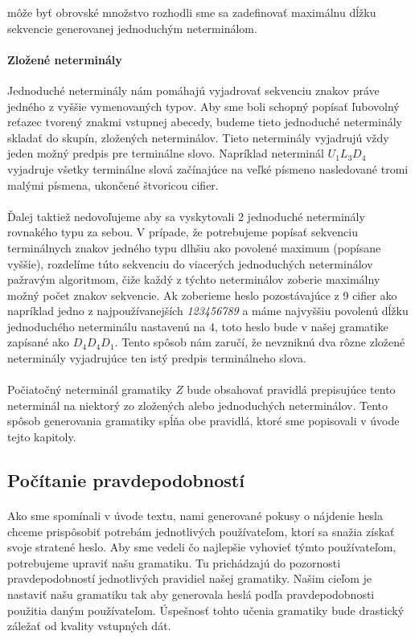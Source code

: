 môže byť obrovské množstvo rozhodli sme sa zadefinovať maximálnu dĺžku sekvencie generovanej jednoduchým neterminálom.

\paragraph{Zložené neterminály}
Jednoduché neterminály nám pomáhajú vyjadrovať sekvenciu znakov práve jedného z vyššie vymenovaných typov. Aby sme boli schopný popísať ľubovolný reťazec tvorený znakmi vstupnej abecedy, budeme tieto jednoduché neterminály skladať do skupín, zložených neterminálov. Tieto neterminály vyjadrujú vždy jeden možný predpis pre terminálne slovo. Napríklad neterminál \(U_1L_3D_4\) vyjadruje všetky terminálne slová začínajúce na veľké písmeno nasledované tromi malými písmena, ukončené štvoricou cifier.
\paragraph{}
Ďalej taktiež nedovoľujeme aby sa vyskytovali 2 jednoduché neterminály rovnakého typu za sebou. V prípade, že potrebujeme popísať sekvenciu terminálnych znakov jedného typu dlhšiu ako povolené maximum (popísane vyššie), rozdelíme túto sekvenciu do viacerých jednoduchých neterminálov pažravým algoritmom, čiže každý z týchto neterminálov zoberie maximálny možný počet znakov sekvencie. Ak zoberieme heslo pozostávajúce z 9 cifier ako napríklad jedno z najpoužívanejších \emph{123456789} a máme najvyššiu povolenú dĺžku jednoduchého neterminálu nastavenú na 4, toto heslo bude v našej gramatike zapísané ako \(D_4D_4D_1\). Tento spôsob nám zaručí, že nevzniknú dva rôzne zložené neterminály vyjadrujúce ten istý predpis terminálneho slova.
\paragraph{}
Počiatočný neterminál gramatiky \(Z\) bude obsahovať pravidlá prepisujúce tento neterminál na niektorý zo zložených alebo jednoduchých neterminálov. Tento spôsob generovania gramatiky spĺňa obe pravidlá, ktoré sme popisovali v úvode tejto kapitoly. 

\subsection{Počítanie pravdepodobností}
\paragraph{}
Ako sme spomínali v úvode textu, nami generované pokusy o nájdenie hesla chceme prispôsobiť potrebám jednotlivých používateľom, ktorí sa snažia získať svoje stratené heslo. Aby sme vedeli čo najlepšie vyhovieť týmto používateľom, potrebujeme upraviť našu gramatiku. Tu prichádzajú do pozornosti pravdepodobností jednotlivých pravidiel našej gramatiky. Našim cieľom je nastaviť našu gramatiku tak aby generovala heslá podľa pravdepodobnosti použitia daným používateľom. Úspešnosť tohto učenia gramatiky bude drastický záležať od kvality vstupných dát.
